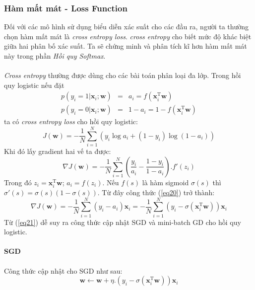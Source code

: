 \documentclass{article}
\begin{document}
\subsubsection*{Hàm mất mát - Loss Function}
Đối với các mô hình sử dụng biểu diễn xác suất cho các đầu ra, người ta thường chọn hàm mất mát là \textit{cross entropy loss}. \textit{cross entropy} cho biết mức độ khác biệt giữa hai phân bố xác suất. Ta sẽ chứng minh và phân tích kĩ hơn hàm mất mát này trong phần \textit{Hồi quy Softmax}.\\\\
\textit{Cross entropy} thường được dùng cho các bài toán phân loại đa lớp. Trong hồi quy logistic nếu đặt 
\begin{eqnarray} 
\label{eq17}
p(y_i=1|\textbf{x}_i;\textbf{w})  &=& a_i = f(\textbf{x}_i^{\text{T}}\textbf{w})  \\
\label{eq18}
p(y_i=0|\textbf{x}_i;\textbf{w}) &=& 1 - a_i =  1-f(\textbf{x}_i^{\text{T}}\textbf{w})
\end{eqnarray}
ta có \textit{cross entropy loss} cho hồi quy logistic:
\begin{equation}
    J(\textbf{w}) = -\frac{1}{N}\sum_{i=1}^{N} \left( y_i \log a_i + (1-y_i) \log (1-a_i) \right)
\end{equation}
Khi đó lấy gradient hai vế ta được:
\begin{equation}
    \nabla J(\textbf{w}) = -\frac{1}{N} \sum_{i=1}^{N} \left( \frac{y_i}{a_i} - \frac{1-y_i}{1-a_i} \right).f'(z_i)
    \label{eq20}
\end{equation}
Trong đó $z_i = \textbf{x}_i^{\text{T}}\textbf{w}$; $a_i = f(z_i)$. Nếu $f(s)$ là hàm sigmoid $\sigma(s)$ thì $\sigma'(s) = \sigma(s)(1-\sigma(s))$. Từ đây công thức (\ref{eq20}) trở thành:
\begin{equation}
    \nabla J(\textbf{w}) = -\frac{1}{N}\sum_{i=1}^{N}(y_i-a_i)\textbf{x}_i=-\frac{1}{N}\sum_{i=1}^{N}(y_i-\sigma(\textbf{x}_i^{\text{T}}\textbf{w}))\textbf{x}_i
    \label{eq21}
\end{equation}
Từ (\ref{eq21}) dễ suy ra công thức cập nhật SGD và mini-batch GD cho hồi quy logistic.
\\\\
\textbf{SGD}\\\\
Công thức cập nhật cho SGD như sau:
\begin{equation}
    \textbf{w} \leftarrow \textbf{w} + \eta. (y_i-\sigma(\textbf{x}_i^{\text{T}}\textbf{w}))\textbf{x}_i
    \label{eq22}
\end{equation}
\end{document}
